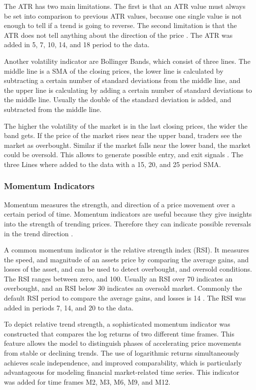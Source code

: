 The ATR has two main limitations.
The first is that an ATR value must always be set into comparison to previous ATR values, because one single value is not enough to tell if a trend is going to reverse.
The second limitation is that the ATR does not tell anything about the direction of the price \cite{investopia-atr}.
The ATR was added in 5, 7, 10, 14, and 18 period to the data.

Another volatility indicator are Bollinger Bands, which consist of three lines.
The middle line is a SMA of the closing prices, the lower line is calculated by subtracting a certain number of standard deviations from the middle line, and the upper line is calculating by adding a certain number of standard deviations to the middle line.
Usually the double of the standard deviation is added, and subtracted from the middle line.

The higher the volatility of the market is in the last closing prices, the wider the band gets.
If the price of the market rises near the upper band, traders see the market as overbought.
Similar if the market falls near the lower band, the market could be oversold.
This allows to generate possible entry, and exit signals \cite{investopia-bb}.
The three Lines where added to the data with a 15, 20, and 25 period SMA.

\subsubsection{Momentum Indicators}

Momentum measures the strength, and direction of a price movement over a certain period of time.
Momentum indicators are useful because they give insights into the strength of trending prices.
Therefore they can indicate possible reversals in the trend direction \cite{investopia-momentum}.

A common momentum indicator is the relative strength index (RSI).
It measures the speed, and magnitude of an assets price by comparing the average gains, and losses of the asset, and can be used to detect overbought, and oversold conditions.
The RSI ranges between zero, and 100.
Usually an RSI over 70 indicates an overbought, and an RSI below 30 indicates an oversold market.
Commonly the default RSI period to compare the average gains, and losses is 14 \cite{investopia-rsi}.
The RSI was added in periods 7, 14, and 20 to the data.

To depict relative trend strength, a sophisticated momentum indicator was constructed that compares the log returns of two different time frames.
This feature allows the model to distinguish phases of accelerating price movements from stable or declining trends.
The use of logarithmic returns simultaneously achieves scale independence, and improved comparability, which is particularly advantageous for modeling financial market-related time series.
This indicator was added for time frames M2, M3, M6, M9, and M12.

